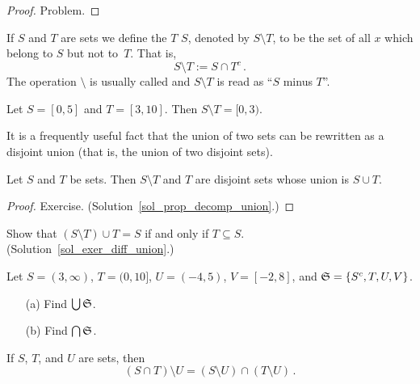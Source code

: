 \begin{proof} Problem. \ns \end{proof}

\begin{defn}If $S$ and $T$ are sets we define the
 $T$  $S$, denoted by $S \setminus T$, to be the set of all
$x$ which belong to $S$ but not to~$T$.  That is,
   \[ S \setminus T :=  S \cap T^c\,. \]
The operation ${}\setminus{}$ is usually called
 and $S \setminus T$ is read as ``$S$ minus $T$''.
\end{defn}

\begin{exam} Let $S = [0,5]$ and $T = [3,10]$.  Then $S \setminus T = [0,3)$.
\end{exam}

It is a frequently useful fact that the union of two sets can be rewritten as a disjoint union
(that is, the union of two disjoint sets).

\begin{prop}\label{prop_decomp_union}  Let $S$ and $T$ be sets. Then $S \setminus T$ and $T$ are
disjoint sets whose union is $S \cup T$.
\end{prop}

\begin{proof} Exercise. (Solution~\ref{sol_prop_decomp_union}.) \ns \end{proof}

\begin{exer}\label{exer_diff_union} Show that $(S \setminus T) \cup T = S$  if and only if
$T \subseteq S$. (Solution~\ref{sol_exer_diff_union}.)
\end{exer}

\begin{prob} Let $S = (3,\infty)$, $T = (0,10]$, $U = (-4,5)$, $V = [-2,8]$, and $\mathfrak{S} =
\{S^c, T, U, V\}$.
 \begin{enumerate}
   \item[(a)]  Find $\bigcup \mathfrak{S}$.
   \item[(b)]  Find $\bigcap \mathfrak{S}$.
 \end{enumerate}
\end{prob}

\begin{prob} If $S$, $T$, and $U$ are sets, then
   \[ (S \cap T) \setminus U  = (S \setminus U) \cap (T \setminus U)\,. \]
\end{prob}

